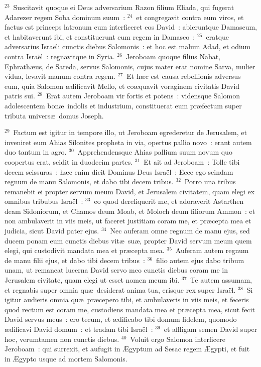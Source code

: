 ${}^{23}$~Suscitavit quoque ei Deus adversarium Razon filium Eliada, qui fugerat Adarezer regem Soba dominum suum~:
${}^{24}$~et congregavit contra eum viros, et factus est princeps latronum cum interficeret eos David~: abieruntque Damascum, et habitaverunt ibi, et constituerunt eum regem in Damasco~:
${}^{25}$~eratque adversarius Isra\"eli cunctis diebus Salomonis~: et hoc est malum Adad, et odium contra Isra\"el~: regnavitque in Syria.
${}^{26}$~Jeroboam quoque filius Nabat, Ephrath\ae us, de Sareda, servus Salomonis, cujus mater erat nomine Sarva, mulier vidua, levavit manum contra regem.
${}^{27}$~Et h\ae c est causa rebellionis adversus eum, quia Salomon \ae dificavit Mello, et co\ae quavit voraginem civitatis David patris sui.
${}^{28}$~Erat autem Jeroboam vir fortis et potens~: vidensque Salomon adolescentem bon\ae\ indolis et industrium, constituerat eum pr\ae fectum super tributa univers\ae\ domus Joseph.


${}^{29}$~Factum est igitur in tempore illo, ut Jeroboam egrederetur de Jerusalem, et inveniret eum Ahias Silonites propheta in via, opertus pallio novo~: erant autem duo tantum in agro.
${}^{30}$~Apprehendensque Ahias pallium suum novum quo coopertus erat, scidit in duodecim partes.
${}^{31}$~Et ait ad Jeroboam~: Tolle tibi decem scissuras~: h\ae c enim dicit Dominus Deus Isra\"el~: Ecce ego scindam regnum de manu Salomonis, et dabo tibi decem tribus.
${}^{32}$~Porro una tribus remanebit ei propter servum meum David, et Jerusalem civitatem, quam elegi ex omnibus tribubus Isra\"el~:
${}^{33}$~eo quod dereliquerit me, et adoraverit Astarthen deam Sidoniorum, et Chamos deum Moab, et Moloch deum filiorum Ammon~: et non ambulaverit in viis meis, ut faceret justitiam coram me, et pr\ae cepta mea et judicia, sicut David pater ejus.
${}^{34}$~Nec auferam omne regnum de manu ejus, sed ducem ponam eum cunctis diebus vit\ae\ su\ae , propter David servum meum quem elegi, qui custodivit mandata mea et pr\ae cepta mea.
${}^{35}$~Auferam autem regnum de manu filii ejus, et dabo tibi decem tribus~:
${}^{36}$~filio autem ejus dabo tribum unam, ut remaneat lucerna David servo meo cunctis diebus coram me in Jerusalem civitate, quam elegi ut esset nomen meum ibi.
${}^{37}$~Te autem assumam, et regnabis super omnia qu\ae\ desiderat anima tua, erisque rex super Isra\"el.
${}^{38}$~Si igitur audieris omnia qu\ae\ pr\ae cepero tibi, et ambulaveris in viis meis, et feceris quod rectum est coram me, custodiens mandata mea et pr\ae cepta mea, sicut fecit David servus meus~: ero tecum, et \ae dificabo tibi domum fidelem, quomodo \ae dificavi David domum~: et tradam tibi Isra\"el~:
${}^{39}$~et affligam semen David super hoc, verumtamen non cunctis diebus.
${}^{40}$~Voluit ergo Salomon interficere Jeroboam~: qui surrexit, et aufugit in \AE gyptum ad Sesac regem \AE gypti, et fuit in \AE gypto usque ad mortem Salomonis.


